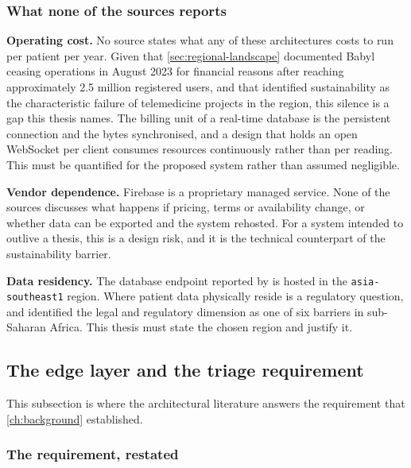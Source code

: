 \documentclass[12pt,a4paper,oneside]{report}
\begin{document}
\subsubsection{What none of the sources reports}\label{sec:cloud-gaps}

\textbf{Operating cost.} No source states what any of these architectures costs to run per patient per year. Given that \cref{sec:regional-landscape} documented Babyl ceasing operations in August 2023 for financial reasons after reaching approximately 2.5 million registered users, and that \textcite{dodoo2022} identified sustainability as the characteristic failure of telemedicine projects in the region, this silence is a gap this thesis names. The billing unit of a real-time database is the persistent connection and the bytes synchronised, and a design that holds an open WebSocket per client consumes resources continuously rather than per reading. This must be quantified for the proposed system rather than assumed negligible.

\textbf{Vendor dependence.} Firebase is a proprietary managed service. None of the sources discusses what happens if pricing, terms or availability change, or whether data can be exported and the system rehosted. For a system intended to outlive a thesis, this is a design risk, and it is the technical counterpart of the sustainability barrier.

\textbf{Data residency.} The database endpoint reported by \textcite{efendi2025} is hosted in the \texttt{asia-southeast1} region. Where patient data physically reside is a regulatory question, and \textcite{dodoo2022} identified the legal and regulatory dimension as one of six barriers in sub-Saharan Africa. This thesis must state the chosen region and justify it.

\subsection{The edge layer and the triage requirement}\label{sec:edge-triage}

This subsection is where the architectural literature answers the requirement that \cref{ch:background} established.

\subsubsection{The requirement, restated}
\end{document}
